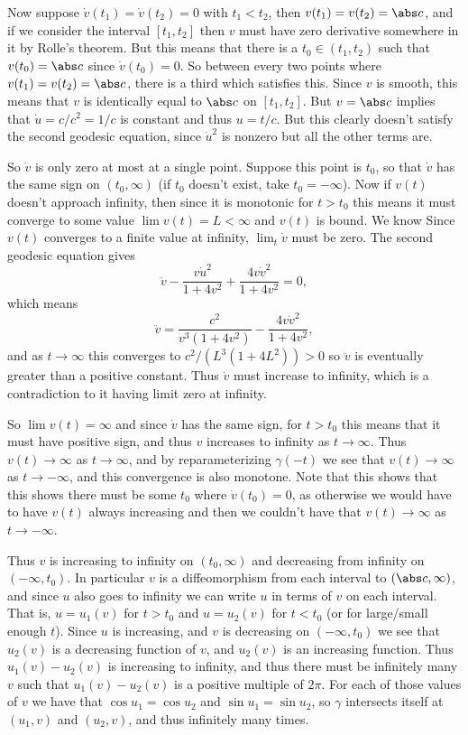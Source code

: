     Now suppose $\dot v(t_1)=\dot v(t_2)=0$ with $t_1<t_2$, then $v(t_1)=v(t_2)=\abs c$, and if we consider the interval $[t_1,t_2]$ then $v$ must have zero derivative somewhere in it by Rolle's theorem.
    But this means that there is a $t_0\in(t_1,t_2)$ such that $v(t_0)=\abs c$ since $\dot v(t_0)=0$.
    So between every two points where $v(t_1)=v(t_2)=\abs c$, there is a third which satisfies this.
    Since $v$ is smooth, this means that $v$ is identically equal to $\abs c$ on $[t_1,t_2]$.
    But $v=\abs c$ implies that $\dot u=c/c^2=1/c$ is constant and thus $u=t/c$.
    But this clearly doesn't satisfy the second geodesic equation, since $\dot u^2$ is nonzero but all the other terms are.

    So $\dot v$ is only zero at most at a single point.
    Suppose this point is $t_0$, so that $\dot v$ has the same sign on $(t_0,\infty)$ (if $t_0$ doesn't exist, take $t_0=-\infty$).
    Now if $v(t)$ doesn't approach infinity, then since it is monotonic for $t>t_0$ this means it must converge to some value $\lim v(t)=L<\infty$ and $v(t)$ is bound.
    We know
    Since $v(t)$ converges to a finite value at infinity, $\lim_t\dot v$ must be zero.
    The second geodesic equation gives
    $$ \ddot v - \frac{v\dot u^2}{1+4v^2} + \frac{4v\dot v^2}{1+4v^2} = 0 , $$
    which means
    $$ \ddot v = \frac{c^2}{v^3(1+4v^2)} - \frac{4v\dot v^2}{1+4v^2} , $$
    and as $t\to\infty$ this converges to $c^2/(L^3(1+4L^2))>0$ so $\ddot v$ is eventually greater than a positive constant.
    Thus $\dot v$ must increase to infinity, which is a contradiction to it having limit zero at infinity.
    
    So $\lim v(t)=\infty$ and since $\dot v$ has the same sign, for $t>t_0$ this means that it must have positive sign, and thus $v$ increases to infinity as $t\to\infty$.
    Thus $v(t)\to\infty$ as $t\to\infty$, and by reparameterizing $\gamma(-t)$ we see that $v(t)\to\infty$ as $t\to-\infty$, and this convergence is also monotone.
    Note that this shows that this shows there must be some $t_0$ where $\dot v(t_0)=0$, as otherwise we would have to have $v(t)$ always increasing and then we couldn't have that $v(t)\to\infty$ as $t\to-\infty$.

    Thus $v$ is increasing to infinity on $(t_0,\infty)$ and decreasing from infinity on $(-\infty,t_0)$.
    In particular $v$ is a diffeomorphism from each interval to $(\abs c,\infty)$, and since $u$ also goes to infinity we can write $u$ in terms of $v$ on each interval.
    That is, $u=u_1(v)$ for $t>t_0$ and $u=u_2(v)$ for $t<t_0$ (or for large/small enough $t$).
    Since $u$ is increasing, and $v$ is decreasing on $(-\infty,t_0)$ we see that $u_2(v)$ is a decreasing function of $v$, and $u_2(v)$ is an increasing function.
    Thus $u_1(v)-u_2(v)$ is increasing to infinity, and thus there must be infinitely many $v$ such that $u_1(v)-u_2(v)$ is a positive multiple of $2\pi$.
    For each of those values of $v$ we have that $\cos u_1=\cos u_2$ and $\sin u_1=\sin u_2$, so $\gamma$ intersects itself at $(u_1,v)$ and $(u_2,v)$, and thus infinitely many times.
\eenum


